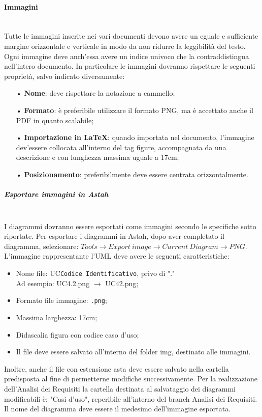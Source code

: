 \paragraph{Immagini}\mbox{}\\
Tutte le immagini inserite nei vari documenti devono avere un eguale e sufficiente margine orizzontale e verticale in modo da non ridurre la leggibilità del testo. Ogni immagine deve anch'essa avere un indice univoco che la contraddistingua nell'intero documento.
In particolare le immagini dovranno rispettare le seguenti proprietà, salvo indicato diversamente:
\begin{itemize}
\item[•] \textbf{Nome}: deve rispettare la {notazione a cammello};
\item[•] \textbf{Formato}: è preferibile utilizzare il formato PNG, ma è accettato anche il PDF in quanto scalabile;
\item[•] \textbf{Importazione in \LaTeX}: quando importata nel documento, l'immagine dev'essere collocata all'interno del tag figure, accompagnata da una descrizione e con lunghezza massima uguale a 17cm;
\item[•] \textbf{Posizionamento}: preferibilmente deve essere centrata orizzontalmente.
\end{itemize}

\subparagraph{Esportare immagini in Astah}\mbox{}\\
I diagrammi dovranno essere esportati come immagini secondo le specifiche sotto riportate. Per esportare i diagrammi in Astah, dopo aver completato il diagramma, selezionare: $Tools \rightarrow Export\ image \rightarrow Current\ Diagram \rightarrow PNG$.
L'immagine rappresentante l'UML deve avere le seguenti caratteristiche:
\begin{itemize}
\item Nome file: UC\texttt{Codice Identificativo}, privo di "."\\
Ad esempio: UC4.2.png $\rightarrow$ UC42.png;
\item Formato file immagine: \texttt{.png};
\item Massima larghezza: 17cm;
\item Didascalia figura con codice caso d'uso;
\item Il file deve essere salvato all'interno del folder img, destinato alle immagini.
\end{itemize}
Inoltre, anche il file con estensione asta deve essere salvato nella cartella predisposta al fine di permetterne modifiche successivamente. 
Per la realizzazione dell'Analisi dei Requisiti la cartella destinata al salvataggio dei diagrammi modificabili è: "Casi d'uso", reperibile all'interno del {branch} Analisi dei Requisiti. Il nome del diagramma deve essere il medesimo dell'immagine esportata.

